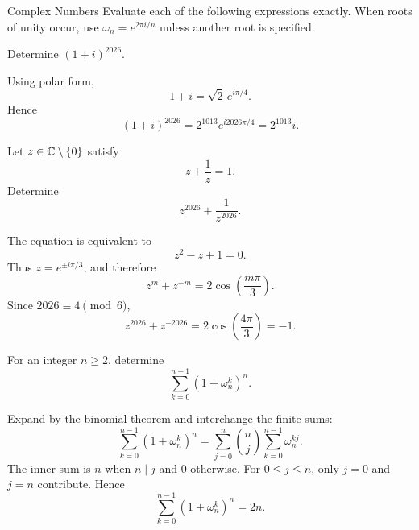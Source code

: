     \begin{expectedproblemgroup}{Complex Numbers}
        Evaluate each of the following expressions exactly. When roots of unity
        occur, use $\omega_n=e^{2\pi i/n}$ unless another root is specified.

        \begin{expectedsubproblem}
            Determine $(1+i)^{2026}$.
        \end{expectedsubproblem}

        \begin{expectedsubsolution}
            Using polar form,
            \[
                1+i=\sqrt2\,e^{i\pi/4}.
            \]
            Hence
            \[
                (1+i)^{2026}
                =
                2^{1013}e^{i2026\pi/4}
                =
                \boxed{2^{1013}i}.
            \]
        \end{expectedsubsolution}

        \begin{expectedsubproblem}
            Let $z\in\mathbb{C}\setminus\{0\}$ satisfy
            \[
                z+\frac{1}{z}=1.
            \]
            Determine
            \[
                z^{2026}+\frac{1}{z^{2026}}.
            \]
        \end{expectedsubproblem}

        \begin{expectedsubsolution}
            The equation is equivalent to
            \[
                z^2-z+1=0.
            \]
            Thus $z=e^{\pm i\pi/3}$, and therefore
            \[
                z^m+z^{-m}=2\cos\left(\frac{m\pi}{3}\right).
            \]
            Since $2026\equiv4\pmod6$,
            \[
                \boxed{
                    z^{2026}+z^{-2026}
                    =
                    2\cos\left(\frac{4\pi}{3}\right)
                    =-1
                }.
            \]
        \end{expectedsubsolution}

        \begin{expectedsubproblem}
            For an integer $n\geq2$, determine
            \[
                \sum_{k=0}^{n-1}(1+\omega_n^k)^n.
            \]
        \end{expectedsubproblem}

        \begin{expectedsubsolution}
            Expand by the binomial theorem and interchange the finite sums:
            \[
                \sum_{k=0}^{n-1}(1+\omega_n^k)^n
                =
                \sum_{j=0}^{n}\binom{n}{j}
                \sum_{k=0}^{n-1}\omega_n^{kj}.
            \]
            The inner sum is $n$ when $n\mid j$ and $0$ otherwise. For
            $0\leq j\leq n$, only $j=0$ and $j=n$ contribute. Hence
            \[
                \boxed{
                    \sum_{k=0}^{n-1}(1+\omega_n^k)^n=2n
                }.
            \]
        \end{expectedsubsolution}


\end{expectedproblemgroup}
